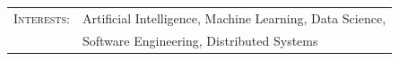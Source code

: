 
\begin{tabular}{rl}
    \textsc{Interests:} &
    Artificial Intelligence, Machine Learning, Data Science, \\
    & Software Engineering, Distributed Systems \\
\end{tabular}
